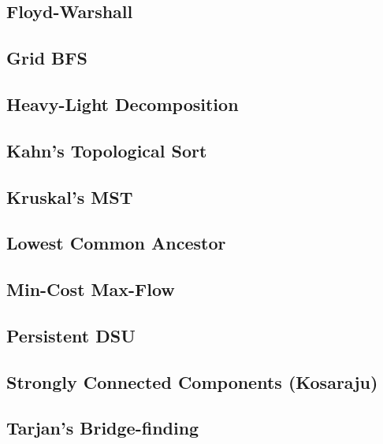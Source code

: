 \subsection{Floyd-Warshall}
\raggedbottom
\hrulefill
\subsection{Grid BFS}
\raggedbottom
\hrulefill
\subsection{Heavy-Light Decomposition}
\raggedbottom
\hrulefill
\subsection{Kahn's Topological Sort}
\raggedbottom
\hrulefill
\subsection{Kruskal's MST}
\raggedbottom
\hrulefill
\subsection{Lowest Common Ancestor}
\raggedbottom
\hrulefill
\subsection{Min-Cost Max-Flow}
\raggedbottom
\hrulefill
\subsection{Persistent DSU}
\raggedbottom
\hrulefill
\subsection{Strongly Connected Components (Kosaraju)}
\raggedbottom
\hrulefill
\subsection{Tarjan's Bridge-finding}
\raggedbottom
\hrulefill

